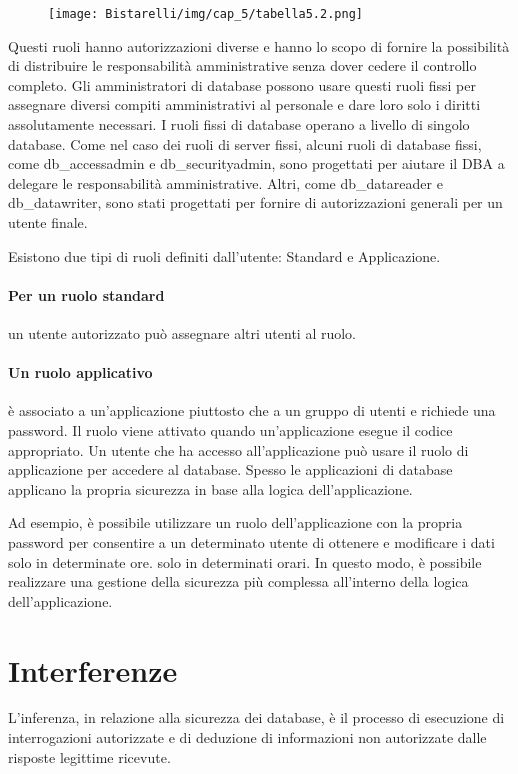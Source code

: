 \begin{figure}[H]
	\centering
    \texttt{[image: Bistarelli/img/cap\_5/tabella5.2.png]}
\end{figure}

Questi ruoli hanno autorizzazioni diverse e hanno lo scopo di fornire la possibilità di distribuire le responsabilità amministrative senza dover cedere il controllo completo. Gli amministratori di database possono usare questi ruoli fissi per assegnare diversi compiti amministrativi al personale e dare loro solo i diritti assolutamente necessari.
I ruoli fissi di database operano a livello di singolo database. Come nel caso dei ruoli di server fissi, alcuni ruoli di database fissi, come db\_accessadmin e db\_securityadmin, sono progettati per aiutare il DBA a delegare le responsabilità amministrative. Altri, come db\_datareader e db\_datawriter, sono stati progettati per fornire di autorizzazioni generali per un utente finale.

\singlespacing

Esistono due tipi di ruoli definiti dall'utente: Standard e Applicazione. 

\singlespacing

\paragraph{Per un ruolo standard} un utente autorizzato può assegnare altri utenti al ruolo.
\paragraph{Un ruolo applicativo} è associato a un'applicazione piuttosto che a un gruppo di utenti e richiede una password. Il ruolo viene attivato quando un'applicazione esegue il codice appropriato. Un utente che ha accesso all'applicazione può usare il ruolo di applicazione per accedere al database. Spesso le applicazioni di database applicano la propria sicurezza in base alla logica dell'applicazione. 

\singlespacing

Ad esempio, è possibile utilizzare un ruolo dell'applicazione con la propria password per consentire a un determinato utente di ottenere e modificare i dati solo in determinate ore. solo in determinati orari. In questo modo, è possibile realizzare una gestione della sicurezza più complessa all'interno della logica dell'applicazione.
\section{Interferenze}
L'inferenza, in relazione alla sicurezza dei database, è il processo di esecuzione di interrogazioni autorizzate e di deduzione di informazioni non autorizzate dalle risposte legittime ricevute.

